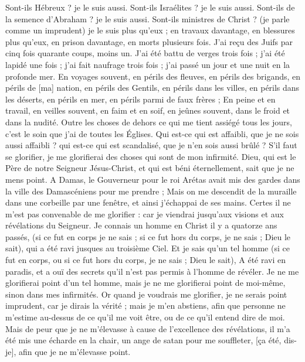 \begin{multicols}{2}
Sont-ils Hébreux ? je le suis aussi. Sont-ils Israélites ? je le suis aussi. Sont-ils de la semence d'Abraham ? je le suis aussi.
Sont-ils ministres de Christ ? (je parle comme un imprudent) je le suis plus qu'eux ; en travaux davantage, en blessures plus qu'eux, en prison davantage, en morts plusieurs fois.
J'ai reçu des Juifs par cinq fois quarante coups, moins un.
J'ai été battu de verges trois fois ; j'ai été lapidé une fois ; j'ai fait naufrage trois fois ; j'ai passé un jour et une nuit en la profonde mer.
En voyages souvent, en périls des fleuves, en périls des brigands, en périls de [ma] nation, en périls des Gentils, en périls dans les villes, en périls dans les déserts, en périls en mer, en périls parmi de faux frères ;
En peine et en travail, en veilles souvent, en faim et en soif, en jeûnes souvent, dans le froid et dans la nudité.
Outre les choses de dehors ce qui me tient assiégé tous les jours, c'est le soin que j'ai de toutes les Églises.
Qui est-ce qui est affaibli, que je ne sois aussi affaibli ? qui est-ce qui est scandalisé, que je n'en sois aussi brûlé ?
S'il faut se glorifier, je me glorifierai des choses qui sont de mon infirmité.
Dieu, qui est le Père de notre Seigneur Jésus-Christ, et qui est béni éternellement, sait que je ne mens point.
A Damas, le Gouverneur pour le roi Arétas avait mis des gardes dans la ville des Damascéniens pour me prendre ;
Mais on me descendit de la muraille dans une corbeille par une fenêtre, et ainsi j'échappai de ses mains.
\VerseOne{}Certes il ne m'est pas convenable de me glorifier : car je viendrai jusqu'aux visions et aux révélations du Seigneur.
Je connais un homme en Christ il y a quatorze ans passés, (si ce fut en corps je ne sais ; si ce fut hors du corps, je ne sais ; Dieu le sait), qui a été ravi jusques au troisième Ciel.
Et je sais qu'un tel homme (si ce fut en corps, ou si ce fut hors du corps, je ne sais ; Dieu le sait),
A été ravi en paradis, et a ouï des secrets qu'il n'est pas permis à l'homme de révéler.
Je ne me glorifierai point d'un tel homme, mais je ne me glorifierai point de moi-même, sinon dans mes infirmités.
Or quand je voudrais me glorifier, je ne serais point imprudent, car je dirais la vérité ; mais je m'en abstiens, afin que personne ne m'estime au-dessus de ce qu'il me voit être, ou de ce qu'il entend dire de moi.
Mais de peur que je ne m'élevasse à cause de l'excellence des révélations, il m'a été mis une écharde en la chair, un ange de satan pour me souffleter, [ça été, dis-je], afin que je ne m'élevasse point.

\end{multicols}
